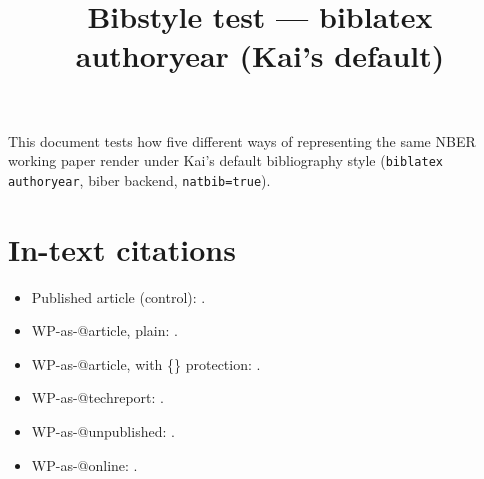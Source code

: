 \documentclass[11pt]{article}
\title{Bibstyle test --- biblatex authoryear (Kai's default)}
\author{}
\date{}
\begin{document}
\maketitle

This document tests how five different ways of representing the same NBER working paper render under Kai's default bibliography style (\texttt{biblatex authoryear}, biber backend, \texttt{natbib=true}).

\section*{In-text citations}

\begin{itemize}
  \item Published article (control): \citep{published2024control}.
  \item WP-as-@article, plain: \citep{wp_article_plain}.
  \item WP-as-@article, with \{\} protection: \citep{wp_article_protected}.
  \item WP-as-@techreport: \citep{wp_techreport}.
  \item WP-as-@unpublished: \citep{wp_unpublished}.
  \item WP-as-@online: \citep{wp_online}.
\end{itemize}

\printbibliography
\end{document}
